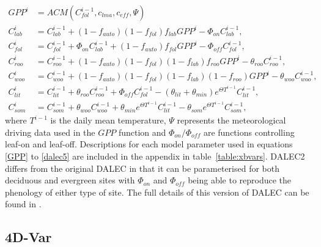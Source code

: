 \documentclass[review]{elsarticle}
\begin{document}
\begin{align}
GPP^{i} &= ACM(C_{fol}^{i-1}, c_{lma}, c_{eff}, \Psi) \label{GPP}
\\C_{lab}^{i}&=C_{lab}^{i-1}+(1-f_{auto})(1-f_{fol})f_{lab}GPP^{i}-\Phi _{on}C_{lab}^{i-1}, \label{daleclab}
\\C_{fol}^{i}&=C_{fol}^{i-1}+\Phi_{on}C_{lab}^{i-1}+(1-f_{auto})f_{fol}GPP^{i}-\Phi_{off}C_{fol}^{i-1}, \label{dalec1}
\\C_{roo}^{i}&=C_{roo}^{i-1}+(1-f_{auto})(1-f_{fol})(1-f_{lab})f_{roo}GPP^{i}-\theta_{roo}C_{roo}^{i-1}, 
\\C_{woo}^{i}&=C_{woo}^{i-1}+(1-f_{auto})(1-f_{fol})(1-f_{lab})(1-f_{roo})GPP^{i}-\theta_{woo}C_{woo}^{i-1}, 
\\C_{lit}^{i}&=C_{lit}^{i-1}+\theta_{roo}C_{roo}^{i-1}+\Phi_{off}C_{fol}^{i-1}-(\theta_{lit}+\theta_{min})e^{\Theta T^{i-1}}C_{lit}^{i-1}, 
\\C_{som}^{i}&=C_{som}^{i-1}+\theta_{woo}C_{woo}^{i-1}+\theta_{min}e^{\Theta T^{i-1}}C_{lit}^{i-1}-\theta_{som}e^{\Theta T^{i-1}}C_{som}^{i-1}, \label{dalec5}
\end{align}
where $T^{i-1}$ is the daily mean temperature, $\Psi$ represents the meteorological driving data used in the $GPP$ function and $\Phi_{on} / \Phi_{off}$ are functions controlling leaf-on and leaf-off. Descriptions for each model parameter used in equations \eqref{GPP} to \eqref{dalec5} are included in the appendix in table~\ref{table:xbvars}. DALEC2 differs from the original DALEC in that it can be parameterised for both deciduous and evergreen sites with $\Phi_{on}$ and $\Phi_{off}$ being able to reproduce the phenology of either type of site. The full details of this version of DALEC can be found in \cite{Bloom2015}. 

\subsection{4D-Var} \label{4dvar}
\end{document}
